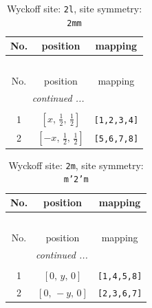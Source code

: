\documentclass[fleqn,8pt]{jsarticle}
\begin{document}
\renewcommand{\arraystretch}{1.2}
\begin{longtable}{ccc}
\caption{Wyckoff site: {\tt 2l}, site symmetry: {\tt 2mm}}
 \\
 \hline \hline
No. & position & mapping \\ \hline \endfirsthead

\multicolumn{2}{l}{\tablename\ \thetable{}} \\
 \hline \hline
No. & position & mapping \\ \hline \endhead

 \hline \hline
\multicolumn{2}{r}{\footnotesize\it continued ...} \\ \endfoot

 \hline \hline
\multicolumn{2}{r}{} \\ \endlastfoot

1 & $\left[ x,\, \frac{1}{2},\, \frac{1}{2} \right]$ & {\tt [1,2,3,4]} \\ \hline
2 & $\left[ - x,\, \frac{1}{2},\, \frac{1}{2} \right]$ & {\tt [5,6,7,8]} \\
\end{longtable}
\renewcommand{\arraystretch}{1.2}
\begin{longtable}{ccc}
\caption{Wyckoff site: {\tt 2m}, site symmetry: {\tt m'2'm}}
 \\
 \hline \hline
No. & position & mapping \\ \hline \endfirsthead

\multicolumn{2}{l}{\tablename\ \thetable{}} \\
 \hline \hline
No. & position & mapping \\ \hline \endhead

 \hline \hline
\multicolumn{2}{r}{\footnotesize\it continued ...} \\ \endfoot

 \hline \hline
\multicolumn{2}{r}{} \\ \endlastfoot

1 & $\left[ 0,\, y,\, 0 \right]$ & {\tt [1,4,5,8]} \\ \hline
2 & $\left[ 0,\, - y,\, 0 \right]$ & {\tt [2,3,6,7]} \\
\end{longtable}
\renewcommand{\arraystretch}{1.2}
\end{document}
